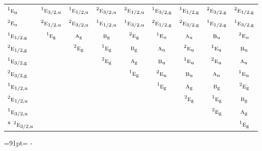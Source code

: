 \documentclass[10pt,a4paper]{article}
\newcommand{\needspace}[1]{\par\penalty-100\begingroup\dimen0=#1\relax\dimen2=\pagegoal
  \advance\dimen2-\pagetotal\ifdim\dimen0>\dimen2\relax\ifdim\dimen2>0pt\vfil\break\fi\fi
  \endgroup}
\numberwithin{equation}{section}
\newcommand{\irr}[1]{\text{\normalfont\scshape #1}}
\newcommand{\conjpair}[1]{{}^{#1}}
\newcommand{\ptag}[1]{\mathrm{#1}}
\begin{document}
{\begin{longtable}{@{}lcccccccc@{}}
$\conjpair{1}\irr{e}_{\ptag{u}}$ & $\conjpair{1}\irr{e}_{3/2,\ptag{u}}$ & $\conjpair{1}\irr{e}_{1/2,\ptag{u}}$ & $\conjpair{2}\irr{e}_{3/2,\ptag{u}}$ & $\conjpair{2}\irr{e}_{1/2,\ptag{u}}$ & $\conjpair{1}\irr{e}_{3/2,\ptag{g}}$ & $\conjpair{1}\irr{e}_{1/2,\ptag{g}}$ & $\conjpair{2}\irr{e}_{3/2,\ptag{g}}$ & $\conjpair{2}\irr{e}_{1/2,\ptag{g}}$\\
$\conjpair{2}\irr{e}_{\ptag{u}}$ & $\conjpair{2}\irr{e}_{1/2,\ptag{u}}$ & $\conjpair{2}\irr{e}_{3/2,\ptag{u}}$ & $\conjpair{1}\irr{e}_{1/2,\ptag{u}}$ & $\conjpair{1}\irr{e}_{3/2,\ptag{u}}$ & $\conjpair{2}\irr{e}_{1/2,\ptag{g}}$ & $\conjpair{2}\irr{e}_{3/2,\ptag{g}}$ & $\conjpair{1}\irr{e}_{1/2,\ptag{g}}$ & $\conjpair{1}\irr{e}_{3/2,\ptag{g}}$\\
$\conjpair{1}\irr{e}_{1/2,\ptag{g}}$ & $\conjpair{1}\irr{e}_{\ptag{g}}$ & $\irr{a}_{\ptag{g}}$ & $\irr{b}_{\ptag{g}}$ & $\conjpair{2}\irr{e}_{\ptag{g}}$ & $\conjpair{1}\irr{e}_{\ptag{u}}$ & $\irr{a}_{\ptag{u}}$ & $\irr{b}_{\ptag{u}}$ & $\conjpair{2}\irr{e}_{\ptag{u}}$\\
$\conjpair{2}\irr{e}_{1/2,\ptag{g}}$ &  & $\conjpair{2}\irr{e}_{\ptag{g}}$ & $\conjpair{1}\irr{e}_{\ptag{g}}$ & $\irr{b}_{\ptag{g}}$ & $\irr{a}_{\ptag{u}}$ & $\conjpair{2}\irr{e}_{\ptag{u}}$ & $\conjpair{1}\irr{e}_{\ptag{u}}$ & $\irr{b}_{\ptag{u}}$\\
$\conjpair{1}\irr{e}_{3/2,\ptag{g}}$ &  &  & $\conjpair{2}\irr{e}_{\ptag{g}}$ & $\irr{a}_{\ptag{g}}$ & $\irr{b}_{\ptag{u}}$ & $\conjpair{1}\irr{e}_{\ptag{u}}$ & $\conjpair{2}\irr{e}_{\ptag{u}}$ & $\irr{a}_{\ptag{u}}$\\
$\conjpair{2}\irr{e}_{3/2,\ptag{g}}$ &  &  &  & $\conjpair{1}\irr{e}_{\ptag{g}}$ & $\conjpair{2}\irr{e}_{\ptag{u}}$ & $\irr{b}_{\ptag{u}}$ & $\irr{a}_{\ptag{u}}$ & $\conjpair{1}\irr{e}_{\ptag{u}}$\\
$\conjpair{1}\irr{e}_{1/2,\ptag{u}}$ &  &  &  &  & $\conjpair{1}\irr{e}_{\ptag{g}}$ & $\irr{a}_{\ptag{g}}$ & $\irr{b}_{\ptag{g}}$ & $\conjpair{2}\irr{e}_{\ptag{g}}$\\
$\conjpair{2}\irr{e}_{1/2,\ptag{u}}$ &  &  &  &  &  & $\conjpair{2}\irr{e}_{\ptag{g}}$ & $\conjpair{1}\irr{e}_{\ptag{g}}$ & $\irr{b}_{\ptag{g}}$\\
$\conjpair{1}\irr{e}_{3/2,\ptag{u}}$ &  &  &  &  &  &  & $\conjpair{2}\irr{e}_{\ptag{g}}$ & $\irr{a}_{\ptag{g}}$\\*
$\conjpair{2}\irr{e}_{3/2,\ptag{u}}$ &  &  &  &  &  &  &  & $\conjpair{1}\irr{e}_{\ptag{g}}$\\
\bottomrule\end{longtable}}
\needspace{91pt}
\end{document}
